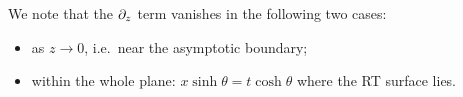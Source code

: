 \documentclass[11pt,a4paper]{article}
\begin{document}
	We note that the $\partial_{z}$ term vanishes in the following two cases:
	\begin{itemize}[noitemsep,topsep=0pt]
	\item as $z\to 0$, i.e.~near the asymptotic boundary;
	\item within the whole plane: $
			x\sinh\theta
			= t\cosh\theta
		$ where the RT surface lies. 
	\end{itemize}

\FloatBarrier

\pagebreak

 





\end{document}
